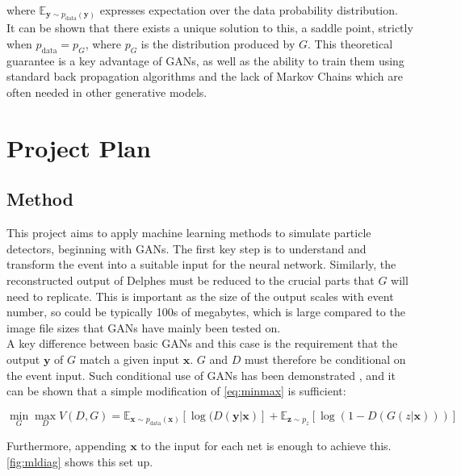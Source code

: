 \documentclass{article}
\begin{document}
where  $\mathbb{E}_{\mathbf{y}\sim p_{\text{data}}(\mathbf{y})}$ expresses expectation over the data probability distribution.  \\

It can be shown that there exists a unique solution to this, a saddle point, strictly when $p_{\text{data}} = p_G$, where $p_G$ is the distribution produced by $G$. This theoretical guarantee is a key advantage of GANs, as well as the ability to train them using standard back propagation algorithms and the lack of Markov Chains which are often needed in other generative models.   



\section{Project Plan}
\label{sec:plan}


\subsection{Method}
This project aims to apply machine learning methods to simulate particle detectors, beginning with GANs. The first key step is to understand and transform the event into a suitable input for the neural network. Similarly, the reconstructed output of Delphes must be reduced to the crucial parts that $G$ will need to replicate. This is important as the size of the output scales with event number, so could be typically 100s of megabytes, which is large compared to the image file sizes that GANs have mainly been tested on.\\

A key difference between basic GANs and this case is the requirement that the output $\mathbf{y}$ of $G$ match a given input $\mathbf{x}$. $G$ and $D$ must therefore be conditional on the event input. Such conditional use of GANs has been demonstrated \cite{mirza2014conditional}, and it can be shown that a simple modification of \cref{eq:minmax} is sufficient:

\[
 \min_{G}\max_{D}V(D,G) = \mathbb{E}_{\mathbf{x}\sim p_{\text{data}}(\mathbf{x})} [\log(D(\mathbf{y|x})] + \mathbb{E}_{\mathbf{z}\sim p_{z}} [\log(1-D(G(z|\mathbf{x})))] 
\]

Furthermore, appending $\mathbf{x}$ to the input for each net is enough to achieve this. \cref{fig:mldiag} shows this set up.
\end{document}
